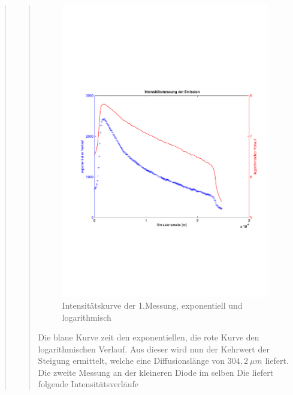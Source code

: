 \begin{quote}
\begin{quote}
        \begin{figure}[H]
                    \centering
                        \includegraphics[scale=0.53, trim = 1cm 6cm 1.5cm 8cm,
                        clip]{./Emissionsbilder/eins/Intensitat_1.pdf}
                        \caption{Intensitätskurve der 1.Messung, exponentiell
                        und logarithmisch}
                            \label{fig:./Emissionsbilder/eins/Intensitat_1.pdf}
        \end{figure}


        Die blaue Kurve zeit den exponentiellen, die rote Kurve den
        logarithmischen Verlauf. Aus dieser wird nun der Kehrwert der Steigung
        ermittelt, welche eine Diffusionslänge von $304,2\ \mu m$ liefert.\\

        Die zweite Messung an der kleineren Diode im selben Die liefert
        folgende Intensitätsverläufe


\end{quote}
\end{quote}
